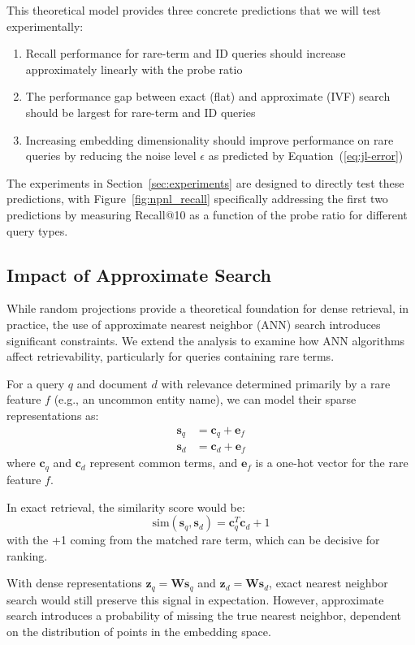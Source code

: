 \documentclass[manuscript]{acmart}
\begin{document}
This theoretical model provides three concrete predictions that we will test experimentally:
\begin{enumerate}
\item Recall performance for rare-term and ID queries should increase approximately linearly with the probe ratio
\item The performance gap between exact (flat) and approximate (IVF) search should be largest for rare-term and ID queries
\item Increasing embedding dimensionality should improve performance on rare queries by reducing the noise level $\epsilon$ as predicted by Equation~(\ref{eq:jl-error})
\end{enumerate}

The experiments in Section~\ref{sec:experiments} are designed to directly test these predictions, with Figure~\ref{fig:npnl_recall} specifically addressing the first two predictions by measuring Recall@10 as a function of the probe ratio for different query types.

\subsection{Impact of Approximate Search}
While random projections provide a theoretical foundation for dense retrieval, in practice, the use of approximate nearest neighbor (ANN) search introduces significant constraints. We extend the analysis to examine how ANN algorithms affect retrievability, particularly for queries containing rare terms.

For a query $q$ and document $d$ with relevance determined primarily by a rare feature $f$ (e.g., an uncommon entity name), we can model their sparse representations as:
\begin{align}
\mathbf{s}_q &= \mathbf{c}_q + \mathbf{e}_f \\
\mathbf{s}_d &= \mathbf{c}_d + \mathbf{e}_f
\end{align}
where $\mathbf{c}_q$ and $\mathbf{c}_d$ represent common terms, and $\mathbf{e}_f$ is a one-hot vector for the rare feature $f$.

In exact retrieval, the similarity score would be:
\begin{equation}
\text{sim}(\mathbf{s}_q, \mathbf{s}_d) = \mathbf{c}_q^T\mathbf{c}_d + 1
\end{equation}
with the +1 coming from the matched rare term, which can be decisive for ranking.

With dense representations $\mathbf{z}_q = \mathbf{W}\mathbf{s}_q$ and $\mathbf{z}_d = \mathbf{W}\mathbf{s}_d$, exact nearest neighbor search would still preserve this signal in expectation. However, approximate search introduces a probability of missing the true nearest neighbor, dependent on the distribution of points in the embedding space.
\end{document}
